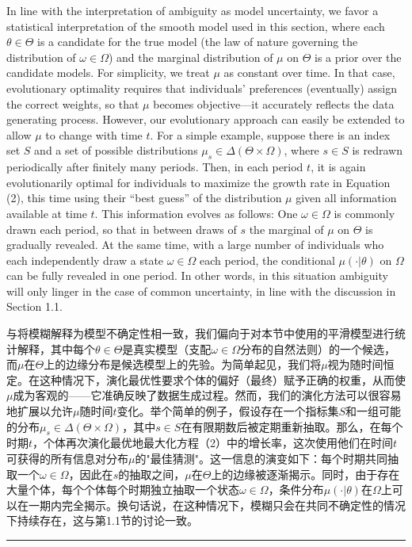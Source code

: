 \documentclass[12pt,a4paper]{article}
\newenvironment{original}
  {\par\noindent\color{black}\smallskip}
  {\par\smallskip}
\newenvironment{translation}
  {\par\noindent\color{blue!70!black}\smallskip}
  {\par\medskip\hrule\medskip}
\begin{document}
\begin{original}
In line with the interpretation of ambiguity as model uncertainty, we favor a statistical interpretation of the smooth model used in this section, where each $\theta \in \Theta$ is a candidate for the true model (the law of nature governing the distribution of $\omega \in \Omega$) and the marginal distribution of $\mu$ on $\Theta$ is a prior over the candidate models. For simplicity, we treat $\mu$ as constant over time. In that case, evolutionary optimality requires that individuals' preferences (eventually) assign the correct weights, so that $\mu$ becomes objective---it accurately reflects the data generating process. However, our evolutionary approach can easily be extended to allow $\mu$ to change with time $t$. For a simple example, suppose there is an index set $S$ and a set of possible distributions $\mu_s \in \Delta(\Theta \times \Omega)$, where $s \in S$ is redrawn periodically after finitely many periods. Then, in each period $t$, it is again evolutionarily optimal for individuals to maximize the growth rate in Equation (2), this time using their ``best guess'' of the distribution $\mu$ given all information available at time $t$. This information evolves as follows: One $\omega \in \Omega$ is commonly drawn each period, so that in between draws of $s$ the marginal of $\mu$ on $\Theta$ is gradually revealed. At the same time, with a large number of individuals who each independently draw a state $\omega \in \Omega$ each period, the conditional $\mu(\cdot|\theta)$ on $\Omega$ can be fully revealed in one period. In other words, in this situation ambiguity will only linger in the case of common uncertainty, in line with the discussion in Section 1.1.
\end{original}
\begin{translation}
与将模糊解释为模型不确定性相一致，我们偏向于对本节中使用的平滑模型进行统计解释，其中每个$\theta \in \Theta$是真实模型（支配$\omega \in \Omega$分布的自然法则）的一个候选，而$\mu$在$\Theta$上的边缘分布是候选模型上的先验。为简单起见，我们将$\mu$视为随时间恒定。在这种情况下，演化最优性要求个体的偏好（最终）赋予正确的权重，从而使$\mu$成为客观的——它准确反映了数据生成过程。然而，我们的演化方法可以很容易地扩展以允许$\mu$随时间$t$变化。举个简单的例子，假设存在一个指标集$S$和一组可能的分布$\mu_s \in \Delta(\Theta \times \Omega)$，其中$s \in S$在有限期数后被定期重新抽取。那么，在每个时期$t$，个体再次演化最优地最大化方程（2）中的增长率，这次使用他们在时间$t$可获得的所有信息对分布$\mu$的"最佳猜测"。这一信息的演变如下：每个时期共同抽取一个$\omega \in \Omega$，因此在$s$的抽取之间，$\mu$在$\Theta$上的边缘被逐渐揭示。同时，由于存在大量个体，每个个体每个时期独立抽取一个状态$\omega \in \Omega$，条件分布$\mu(\cdot|\theta)$在$\Omega$上可以在一期内完全揭示。换句话说，在这种情况下，模糊只会在共同不确定性的情况下持续存在，这与第1.1节的讨论一致。
\end{translation}
\newpage
\end{document}
